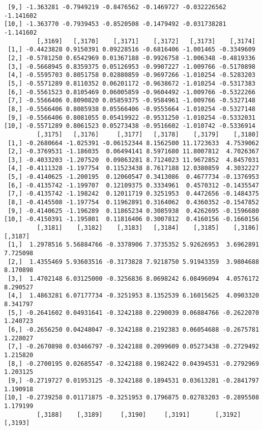 \documentclass[
  letterpaper,
  DIV=11,
  numbers=noendperiod]{scrreprt}
\begin{document}
\begin{verbatim}
 [9,] -1.363281 -0.7949219 -0.8476562 -0.1469727 -0.032226562 -1.141602
[10,] -1.363770 -0.7939453 -0.8520508 -0.1479492 -0.031738281 -1.141602
         [,3169]   [,3170]    [,3171]    [,3172]   [,3173]    [,3174]
 [1,] -0.4423828 0.9150391 0.09228516 -0.6816406 -1.001465 -0.3349609
 [2,] -0.5781250 0.6542969 0.01367188 -0.9926758 -1.006348 -0.4819336
 [3,] -0.5668945 0.8359375 0.05126953 -0.9907227 -1.009766 -0.5170898
 [4,] -0.5595703 0.8051758 0.02880859 -0.9697266 -1.010254 -0.5283203
 [5,] -0.5571289 0.8110352 0.06201172 -0.9638672 -1.010254 -0.5317383
 [6,] -0.5561523 0.8105469 0.06005859 -0.9604492 -1.009766 -0.5322266
 [7,] -0.5566406 0.8090820 0.05859375 -0.9584961 -1.009766 -0.5327148
 [8,] -0.5566406 0.8085938 0.05566406 -0.9555664 -1.010254 -0.5327148
 [9,] -0.5566406 0.8081055 0.05419922 -0.9531250 -1.010254 -0.5332031
[10,] -0.5571289 0.8061523 0.05273438 -0.9516602 -1.010742 -0.5336914
         [,3175]   [,3176]     [,3177]   [,3178]    [,3179]    [,3180]
 [1,] -0.2680664 -1.025391 -0.06152344 8.1562500 11.1723633  4.7539062
 [2,] -0.3769531 -1.186035  0.06494141 8.5971680 11.8007812  4.7026367
 [3,] -0.4033203 -1.207520  0.09863281 8.7124023 11.9672852  4.8457031
 [4,] -0.4111328 -1.197754  0.11523438 8.7617188 12.0380859  4.3032227
 [5,] -0.4140625 -1.200195  0.12060547 0.3413086  0.4677734 -0.1376953
 [6,] -0.4135742 -1.199707  0.12109375 0.3334961  0.4570312 -0.1435547
 [7,] -0.4135742 -1.198242  0.12011719 0.3251953  0.4472656 -0.1484375
 [8,] -0.4145508 -1.197754  0.11962891 0.3164062  0.4360352 -0.1547852
 [9,] -0.4140625 -1.196289  0.11865234 0.3085938  0.4262695 -0.1596680
[10,] -0.4150391 -1.195801  0.11816406 0.3007812  0.4160156 -0.1660156
         [,3181]    [,3182]    [,3183]   [,3184]    [,3185]    [,3186]  [,3187]
 [1,]  1.2978516 5.56884766 -0.3378906 7.3735352 5.92626953  3.6962891 7.725098
 [2,]  1.4355469 5.93603516 -0.3173828 7.9218750 5.91943359  3.9804688 8.170898
 [3,]  1.4702148 6.03125000 -0.3256836 8.0698242 6.08496094  4.0576172 8.290527
 [4,]  1.4863281 6.07177734 -0.3251953 8.1352539 6.16015625  4.0903320 8.341797
 [5,] -0.2641602 0.04931641 -0.3242188 0.2290039 0.06884766 -0.2622070 1.240723
 [6,] -0.2656250 0.04248047 -0.3242188 0.2192383 0.06054688 -0.2675781 1.228027
 [7,] -0.2670898 0.03466797 -0.3242188 0.2099609 0.05273438 -0.2729492 1.215820
 [8,] -0.2700195 0.02685547 -0.3242188 0.1982422 0.04394531 -0.2792969 1.203125
 [9,] -0.2719727 0.01953125 -0.3242188 0.1894531 0.03613281 -0.2841797 1.190918
[10,] -0.2739258 0.01171875 -0.3251953 0.1796875 0.02783203 -0.2895508 1.179199
         [,3188]    [,3189]     [,3190]     [,3191]       [,3192]    [,3193]

\end{verbatim}
\end{document}
